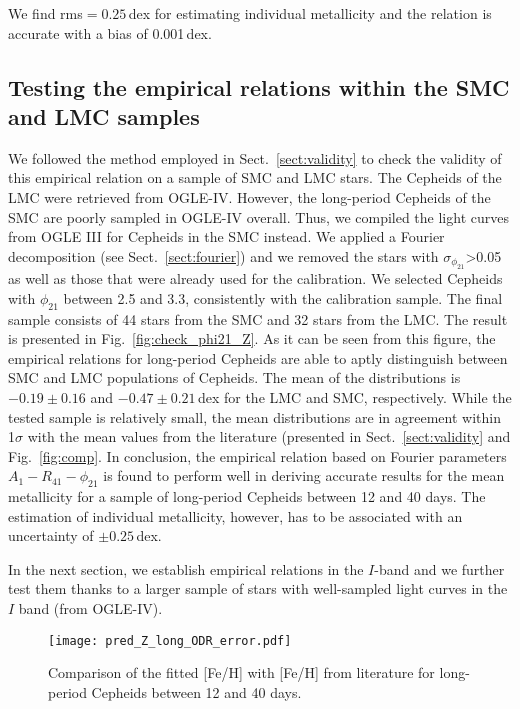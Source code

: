 \documentclass[article]{aa} %
\begin{document}
 We find rms$=0.25\,$dex for estimating individual metallicity and the relation is accurate with a bias of 0.001$\,$dex.

\subsection{Testing the empirical relations within the SMC and LMC samples}\label{sect:validity_long}
We followed the method employed in Sect.~\ref{sect:validity} to check the validity of this empirical relation on a sample of SMC and LMC stars. The Cepheids of the LMC were retrieved from OGLE-IV. However, the long-period Cepheids of the SMC are poorly sampled in OGLE-IV overall. Thus, we compiled the light curves from OGLE III for Cepheids in the SMC instead. We applied a Fourier decomposition (see Sect.~\ref{sect:fourier}) and we removed the stars with $\sigma_{\phi_{21}}$>0.05 as well as those that were  already used for the calibration. We selected Cepheids with $\phi_{21}$ between 2.5 and 3.3, consistently with the calibration sample. The final sample consists of 44 stars from the SMC and 32 stars from the LMC. The result is presented in Fig.~\ref{fig:check_phi21_Z}. As it can be seen from this figure, the empirical relations for long-period Cepheids are able to aptly distinguish between SMC and LMC populations of Cepheids. The mean of the distributions is $-0.19\pm0.16$ and $-0.47\pm0.21\,$dex for the LMC and SMC, respectively. While the tested sample is relatively small, the mean distributions are in agreement within 1$\sigma$ with the mean values from the literature (presented in Sect.~\ref{sect:validity}  and Fig.~\ref{fig:comp}.
In conclusion, the empirical relation based on Fourier parameters $A_1-R_{41}-\phi_{21}$ is found to perform well in deriving accurate results for the mean metallicity for a sample of long-period Cepheids between 12 and 40 days. The estimation of individual metallicity, however, has to be associated with an uncertainty of $\pm0.25\,$dex.

In the next section, we establish empirical relations in the $I$-band and we further test them thanks to a larger sample of stars with well-sampled light curves in the $I$ band (from OGLE-IV).
\begin{figure}
\begin{center}
\texttt{[image: pred\_Z\_long\_ODR\_error.pdf]}
\caption{\small Comparison of the fitted [Fe/H] with [Fe/H] from literature for long-period Cepheids between 12 and 40 days.} \label{fig:fit_long}
\end{center}
\end{figure}
\end{document}
